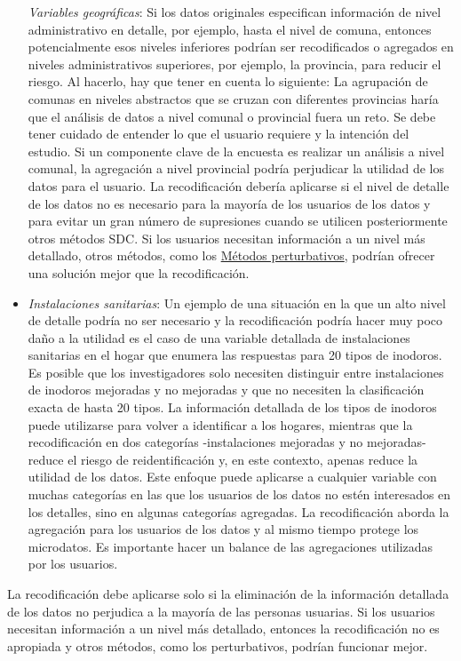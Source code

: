 \documentclass[]{book}
\theoremstyle{definition}
\theoremstyle{definition}
\theoremstyle{definition}
\theoremstyle{definition}
\theoremstyle{remark}
\begin{document}
\begin{itemize}
  \emph{Variables geográficas}: Si los datos originales especifican información de nivel administrativo en detalle, por ejemplo, hasta el nivel de comuna, entonces potencialmente esos niveles inferiores podrían ser recodificados o agregados en niveles administrativos superiores, por ejemplo, la provincia, para reducir el riesgo. Al hacerlo, hay que tener en cuenta lo siguiente: La agrupación de comunas en niveles abstractos que se cruzan con diferentes provincias haría que el análisis de datos a nivel comunal o provincial fuera un reto. Se debe tener cuidado de entender lo que el usuario requiere y la intención del estudio. Si un componente clave de la encuesta es realizar un análisis a nivel comunal, la agregación a nivel provincial podría perjudicar la utilidad de los datos para el usuario. La recodificación debería aplicarse si el nivel de detalle de los datos no es necesario para la mayoría de los usuarios de los datos y para evitar un gran número de supresiones cuando se utilicen posteriormente otros métodos SDC. Si los usuarios necesitan información a un nivel más detallado, otros métodos, como los \protect\hyperlink{muxe9todos-perturbativos}{Métodos perturbativos}, podrían ofrecer una solución mejor que la recodificación.
\item
  \emph{Instalaciones sanitarias}: Un ejemplo de una situación en la que un alto nivel de detalle podría no ser necesario y la recodificación podría hacer muy poco daño a la utilidad es el caso de una variable detallada de instalaciones sanitarias en el hogar que enumera las respuestas para 20 tipos de inodoros. Es posible que los investigadores solo necesiten distinguir entre instalaciones de inodoros mejoradas y no mejoradas y que no necesiten la clasificación exacta de hasta 20 tipos. La información detallada de los tipos de inodoros puede utilizarse para volver a identificar a los hogares, mientras que la recodificación en dos categorías -instalaciones mejoradas y no mejoradas- reduce el riesgo de reidentificación y, en este contexto, apenas reduce la utilidad de los datos. Este enfoque puede aplicarse a cualquier variable con muchas categorías en las que los usuarios de los datos no estén interesados en los detalles, sino en algunas categorías agregadas. La recodificación aborda la agregación para los usuarios de los datos y al mismo tiempo protege los microdatos. Es importante hacer un balance de las agregaciones utilizadas por los usuarios.
\end{itemize}

La recodificación debe aplicarse solo si la eliminación de la información detallada de los datos no perjudica a la mayoría de las personas usuarias. Si los usuarios necesitan información a un nivel más detallado, entonces la recodificación no es apropiada y otros métodos, como los perturbativos, podrían funcionar mejor.
\end{document}
